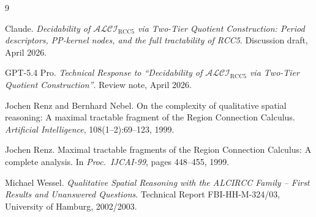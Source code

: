 \documentclass[11pt]{article}
\newcommand{\ALCIRCC}[1]{\mathcal{ALCI}_{\text{RCC#1}}}
\begin{document}
\begin{thebibliography}{9}

Claude.
\newblock \emph{Decidability of $\ALCIRCC{5}$ via Two-Tier Quotient
Construction: Period descriptors, PP-kernel nodes, and the full
tractability of RCC5}.
\newblock Discussion draft, April 2026.

GPT-5.4 Pro.
\newblock \emph{Technical Response to ``Decidability of $\ALCIRCC{5}$ via
Two-Tier Quotient Construction''}.
\newblock Review note, April 2026.

Jochen Renz and Bernhard Nebel.
\newblock On the complexity of qualitative spatial reasoning: A maximal
tractable fragment of the Region Connection Calculus.
\newblock \emph{Artificial Intelligence}, 108(1--2):69--123, 1999.

Jochen Renz.
\newblock Maximal tractable fragments of the Region Connection
Calculus: A complete analysis.
\newblock In \emph{Proc.\ IJCAI-99}, pages 448--455, 1999.

Michael Wessel.
\newblock \emph{Qualitative Spatial Reasoning with the ALCIRCC
Family -- First Results and Unanswered Questions}.
\newblock Technical Report FBI-HH-M-324/03, University of Hamburg, 2002/2003.

\end{thebibliography}
\end{document}
